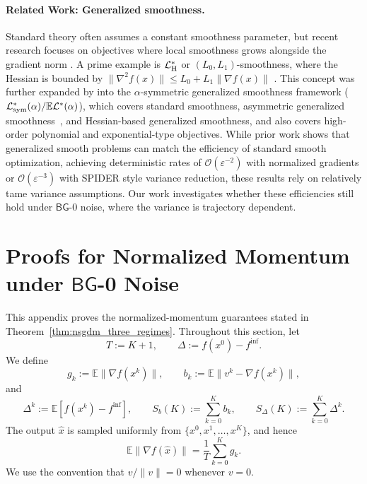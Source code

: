\documentclass[letter,11pt]{article}
\newcommand{\E}{\mathbb{E}}
\newcommand{\Ocal}{\mathcal{O}}
\newcommand{\Lcal}{\mathcal{L}}
\begin{document}
\paragraph{Related Work: Generalized smoothness.}
Standard theory often assumes a constant smoothness parameter, but recent research focuses on objectives where local smoothness grows alongside the gradient norm \cite{carmon2019lower_i, ghadimi2013stochastic}. A prime example is $\Lcal^*_{\rm H}$ or $(L_0, L_1)$-smoothness, where the Hessian is bounded by $\|\nabla^2 f(x)\| \le L_0 + L_1\|\nabla f(x)\|$ \cite{zhang2019gradient}. This concept was further expanded by \citet{chen2023generalized} into the $\alpha$-symmetric generalized smoothness framework ($\Lcal_{\rm sym}^*(\alpha)/\E\Lcal^*(\alpha)$), which covers standard smoothness, asymmetric generalized smoothness~\cite{jin2021non,levy2020large,reisizadeh2025variance}, and Hessian-based generalized smoothness, and also covers high-order polynomial and exponential-type objectives. While prior work shows that generalized smooth problems can match the efficiency of standard smooth optimization, achieving deterministic rates of $\Ocal(\varepsilon^{-2})$ with normalized gradients or $\Ocal(\varepsilon^{-3})$ with SPIDER style variance reduction, these results rely on relatively tame variance assumptions. Our work investigates whether these efficiencies still hold under $\mathsf{BG}$-0 noise, where the variance is trajectory dependent.
\newpage
\section{Proofs for Normalized Momentum under \texorpdfstring{$\mathsf{BG}$}{BG}-0 Noise}
\label{apdx:nsgdm_proofs}

This appendix proves the normalized-momentum guarantees stated in
Theorem~\ref{thm:nsgdm_three_regimes}. Throughout this section, let
\[
    T:=K+1,
    \qquad
    \Delta:=f(x^0)-f^{\inf}.
\]
We define
\[
    g_k:=\E\|\nabla f(x^k)\|,
    \qquad
    b_k:=\E\|v^k-\nabla f(x^k)\|,
\]
and
\[
    \Delta^k:=\E[f(x^k)-f^{\inf}],
    \qquad
    S_b(K):=\sum_{k=0}^K b_k,
    \qquad
    S_\Delta(K):=\sum_{k=0}^K \Delta^k.
\]
The output \(\widehat x\) is sampled uniformly from
\(\{x^0,x^1,\ldots,x^K\}\), and hence
\begin{equation}
\label{eq:app_uniform_output_identity}
    \E\|\nabla f(\widehat x)\|
    =
    \frac1T\sum_{k=0}^K g_k.
\end{equation}
We use the convention that \(v/\|v\|=0\) whenever \(v=0\).
\end{document}
